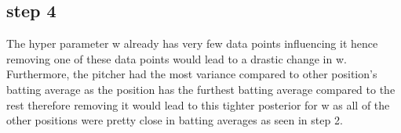 \documentclass[
]{article}
\begin{document}
\hypertarget{step-4-1}{%
\subsection{step 4}\label{step-4-1}}

The hyper parameter w already has very few data points influencing it
hence removing one of these data points would lead to a drastic change
in w. Furthermore, the pitcher had the most variance compared to other
position's batting average as the position has the furthest batting
average compared to the rest therefore removing it would lead to this
tighter posterior for w as all of the other positions were pretty close
in batting averages as seen in step 2.
\end{document}
